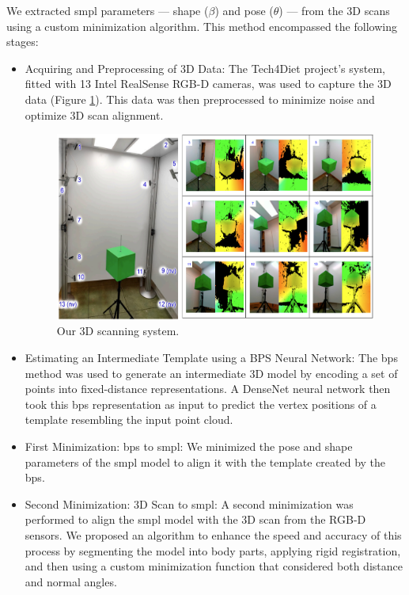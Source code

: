 We extracted \gls{smpl} parameters — shape ($\beta$) and pose ($\theta$) — from
the 3D scans using a custom minimization algorithm. This method encompassed the
following stages:

\begin{itemize}
	\item Acquiring and Preprocessing of 3D Data: The Tech4Diet project's system, fitted
	      with 13 Intel RealSense RGB-D cameras, was used to capture the 3D data (Figure
	      \ref{fig:cameras_scan}). This data was then preprocessed to minimize noise and
	      optimize 3D scan alignment.

	      \begin{figure}[H]
		      \centering
		      \includegraphics[width=\textwidth]{files/cameras_scan.png}
		      \caption{Our 3D scanning system.}
		      \label{fig:cameras_scan}
	      \end{figure}

	\item Estimating an Intermediate Template using a BPS Neural Network: The \gls{bps}
	      method was used to generate an intermediate 3D model by encoding a set of
	      points into fixed-distance representations. A DenseNet neural network then took
	      this \gls{bps} representation as input to predict the vertex positions of a
	      template resembling the input point cloud.

	\item First Minimization: \gls{bps} to \gls{smpl}: We minimized the pose and shape
	      parameters of the \gls{smpl} model to align it with the template created by the
	      \gls{bps}.

	\item Second Minimization: 3D Scan to \gls{smpl}: A second minimization was performed
	      to align the \gls{smpl} model with the 3D scan from the RGB-D sensors. We
	      proposed an algorithm to enhance the speed and accuracy of this process by
	      segmenting the model into body parts, applying rigid registration, and then
	      using a custom minimization function that considered both distance and normal
	      angles.
\end{itemize}

